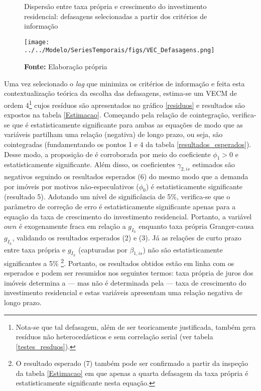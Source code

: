 \begin{figure}[htb]
	\centering
	\caption{Dispersão entre taxa própria e crescimento do investimento residencial: defasagens selecionadas a partir dos critérios de informação}
	\label{defasagens}
	\texttt{[image: ../../Modelo/SeriesTemporais/figs/VEC\_Defasagens.png]}
	\caption*{\textbf{Fonte:} Elaboração própria}
\end{figure}



Uma vez selecionado o \textit{lag} que minimiza os critérios de informação e feita esta contextualização teórica da escolha das defasagens,  estima-se um VECM de ordem 4\footnote{Nota-se que tal defasagem, além de ser teoricamente justificada, também gera resíduos não heterocedásticos e sem correlação serial (ver tabela \ref{testes_resduos}).} cujos resíduos são apresentados no gráfico \ref{residuos} e resultados são expostos na tabela \ref{Estimacao}.
Começando pela relação de cointegração, verifica-se que é estatisticamente significante para ambas as equações de modo que as variáveis partilham uma relação (negativa) de longo prazo, ou seja, são cointegradas (fundamentando os pontos 1 e 4 da tabela \ref{resultados_esperados}).
Desse modo, a proposição de \textcite{teixeira_crescimento_2015} é corroborada por meio do coeficiente $\phi_1> 0$ e estatisticamente significante.
Além disso, os coeficientes $\gamma_{2,is}$ estimados são negativos seguindo os resultados esperados (6) do mesmo modo que a demanda por imóveis por motivos não-especulativos ($\phi_0$) é estatisticamente significante (resultado 5).
Adotando um nível de significância de 5\%, verifica-se que o parâmetro de correção de erro é estatisticamente significante apenas para a equação da taxa de crescimento do investimento residencial. Portanto, a variável $own$ é exogenamente fraca em relação a $g_{I_h}$ enquanto taxa própria Granger-causa $g_{I_h}$, validando os resultados esperados (2) e (3).
Já as relações de curto prazo entre taxa própria e $g_{I_h}$ (capturadas por $\beta_{1,is}$) não são estatisticamente significantes a 5\% \footnote{O resultado esperado (7) também pode ser confirmado a partir da inspeção da tabela \ref{Estimacao} em que apenas a quarta defasagem da taxa própria é estatisticamente significante nesta equação.}. Portanto, os resultados obtidos estão em linha com os esperados e podem ser resumidos nos seguintes termos: taxa própria de juros dos imóveis determina a --- mas não é determinada pela --- taxa de crescimento do investimento residencial e estas variáveis apresentam uma relação negativa de longo prazo.

